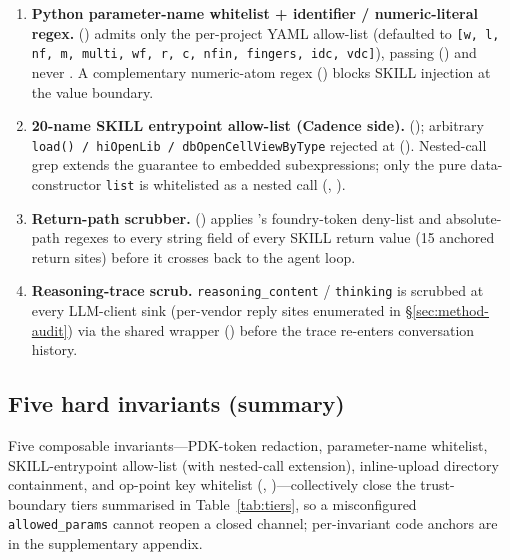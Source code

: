 \begin{enumerate}
  \item \textbf{Python parameter-name whitelist + identifier /
    numeric-literal regex.}
    () admits only the
    per-project YAML allow-list (defaulted to
    \texttt{[w, l, nf, m, multi, wf, r, c, nfin, fingers, idc, vdc]}),
    passing 
    () and never
    . A complementary numeric-atom
    regex () blocks SKILL injection
    at the value boundary.

  \item \textbf{20-name SKILL entrypoint allow-list (Cadence side).}
    (); arbitrary
    \texttt{load() / hiOpenLib / dbOpenCellViewByType} rejected at
    (). Nested-call grep
    extends the guarantee to embedded subexpressions; only the
    pure data-constructor \texttt{list} is whitelisted as a
    nested call (,
    ).

  \item \textbf{Return-path scrubber.}
     ()
    applies 's foundry-token deny-list
    and absolute-path regexes to every string field of every SKILL
    return value (15 anchored return sites) before it crosses back to
    the agent loop.

  \item \textbf{Reasoning-trace scrub.}
    \texttt{reasoning\_content} / \texttt{thinking} is scrubbed at
    every LLM-client sink (per-vendor reply sites enumerated in
    \S\ref{sec:method-audit}) via the shared  wrapper
    () before the trace re-enters
    conversation history.
\end{enumerate}

\subsection{Five hard invariants (summary)}
\label{sec:platform-invariants}

Five composable invariants---PDK-token redaction, parameter-name
whitelist, SKILL-entrypoint allow-list (with nested-call
extension), inline-upload directory containment, and op-point key
whitelist (,
)---collectively close the
trust-boundary tiers summarised in Table~\ref{tab:tiers}, so a
misconfigured \texttt{allowed\_params} cannot reopen a closed
channel; per-invariant code anchors are in the supplementary
appendix.


